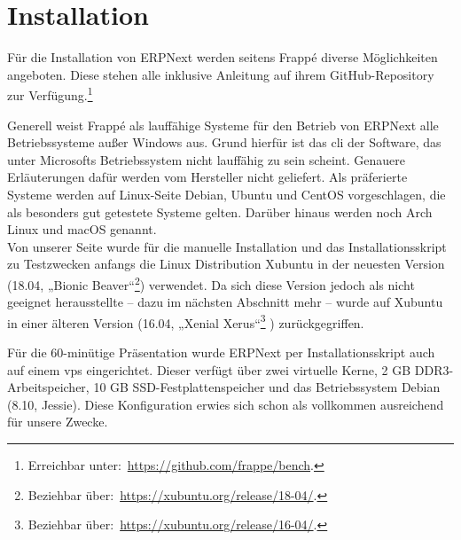 \chapter{Installation}
\label{chap:inst}

Für die Installation von ERPNext werden seitens Frappé diverse Möglichkeiten angeboten. Diese stehen alle inklusive Anleitung auf ihrem GitHub-Repository zur Verfügung.\footnote{Erreichbar unter:\ \url{https://github.com/frappe/bench}.}

Generell weist Frappé als lauffähige Systeme für den Betrieb von ERPNext alle Betriebssysteme außer Windows aus. Grund hierfür ist das \gls{cli} der Software, das unter Microsofts Betriebssystem nicht lauffähig zu sein scheint. Genauere Erläuterungen dafür werden vom Hersteller nicht geliefert. Als präferierte Systeme werden auf Linux-Seite Debian, Ubuntu und CentOS vorgeschlagen, die als besonders gut getestete Systeme gelten. Darüber hinaus werden noch Arch Linux und macOS genannt. \\
Von unserer Seite wurde für die manuelle Installation und das Installationsskript zu Testzwecken anfangs die Linux Distribution Xubuntu in der neuesten Version (18.04, „Bionic Beaver“\footnote{Beziehbar über:\ \url{https://xubuntu.org/release/18-04/}.}) verwendet. Da sich diese Version jedoch als nicht geeignet herausstellte – dazu im nächsten Abschnitt mehr – wurde auf Xubuntu in einer älteren Version (16.04, „Xenial Xerus“\footnote{Beziehbar über:\ \url{https://xubuntu.org/release/16-04/}.} ) zurückgegriffen.
 
Für die 60-minütige Präsentation wurde ERPNext per Installationsskript auch auf einem \gls{vps} eingerichtet. Dieser verfügt über zwei virtuelle Kerne, 2 GB DDR3-Arbeitspeicher, 10 GB SSD-Festplattenspeicher und das Betriebssystem Debian (8.10, Jessie). Diese Konfiguration erwies sich schon als vollkommen ausreichend für unsere Zwecke.

